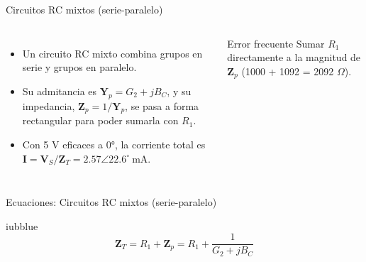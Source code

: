 \documentclass[aspectratio=169,11pt,xcolor={table}]{beamer}
\begin{document}
\begin{frame}{Circuitos RC mixtos (serie-paralelo)}
\begin{columns}[c,onlytextwidth]
\small
\begin{itemize}\setlength{\itemsep}{4pt}
  \item Un circuito RC mixto combina grupos en serie y grupos en paralelo.
  \item Su admitancia es $\mathbf{Y}_p = G_2 + jB_C$, y su impedancia, $\mathbf{Z}_p = 1/\mathbf{Y}_p$, se pasa a forma rectangular para poder sumarla con $R_1$.
  \item Con 5 V eficaces a 0°, la corriente total es $\mathbf{I} = \mathbf{V}_S/\mathbf{Z}_T = 2.57 \angle 22.6^\circ\ \text{mA}$.
\end{itemize}
\begin{cardO}{Error frecuente}
\footnotesize Sumar $R_1$ directamente a la magnitud de $\mathbf{Z}_p$ (1000 + 1092 = 2092 \ensuremath{\Omega}).
\end{cardO}
\end{columns}
\end{frame}

\begin{frame}{Ecuaciones: Circuitos RC mixtos (serie-paralelo)}
\begin{cajaplana}{iubblue}
\centering
{\large
\begin{equation*}
  \mathbf{Z}_T = R_1 + \mathbf{Z}_p = R_1 + \frac{1}{G_2 + jB_C}
\end{equation*}
}
\end{cajaplana}
\end{frame}
\end{document}
